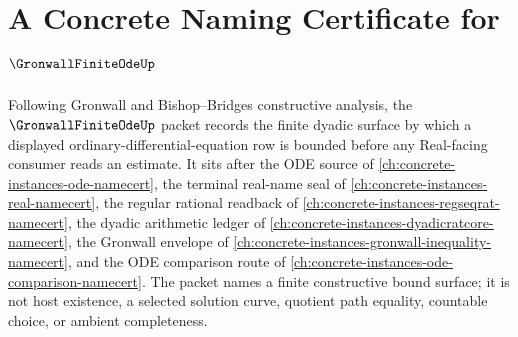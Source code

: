 \chapter{A Concrete Naming Certificate for $\GronwallFiniteOdeUp$}
\label{ch:concrete-instances-gronwall-finite-ode-namecert}

Following Gronwall and Bishop--Bridges constructive analysis, the $\GronwallFiniteOdeUp$ packet records the finite dyadic surface by which a displayed ordinary-differential-equation row is bounded before any Real-facing consumer reads an estimate. It sits after the ODE source of \autoref{ch:concrete-instances-ode-namecert}, the terminal real-name seal of \autoref{ch:concrete-instances-real-namecert}, the regular rational readback of \autoref{ch:concrete-instances-regseqrat-namecert}, the dyadic arithmetic ledger of \autoref{ch:concrete-instances-dyadicratcore-namecert}, the Gronwall envelope of \autoref{ch:concrete-instances-gronwall-inequality-namecert}, and the ODE comparison route of \autoref{ch:concrete-instances-ode-comparison-namecert}. The packet names a finite constructive bound surface; it is not host existence, a selected solution curve, quotient path equality, countable choice, or ambient completeness.

